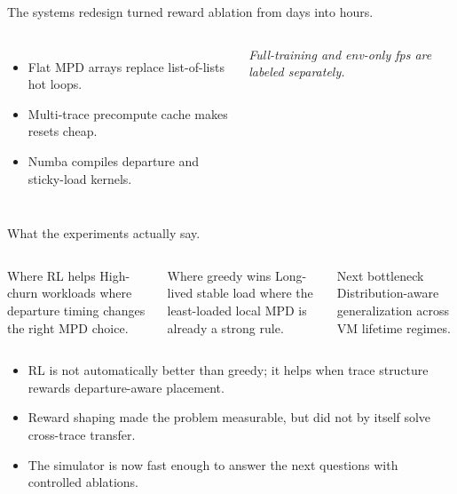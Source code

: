 \documentclass[11pt,aspectratio=43]{beamer}
\begin{document}
\begin{frame}[shrink=5]{The systems redesign turned reward ablation from days into hours.}
\begin{columns}[T,onlytextwidth]
      \vspace{0.6em}
      \begin{itemize}
        \setlength{\itemsep}{0.35em}
        \item Flat MPD arrays replace list-of-lists hot loops.
        \item Multi-trace precompute cache makes resets cheap.
        \item Numba compiles departure and sticky-load kernels.
      \end{itemize}

      \vspace{0.3em}
      \small\textit{Full-training and env-only fps are labeled separately.}

  \end{columns}

\end{frame}


\begin{frame}[shrink=5]{What the experiments actually say.}

  \begin{columns}[T,onlytextwidth]

      \begin{block}{Where RL helps}
        \small
        High-churn workloads where departure timing changes the right MPD choice.
      \end{block}

      \begin{block}{Where greedy wins}
        \small
        Long-lived stable load where the least-loaded local MPD is already a
        strong rule.
      \end{block}

      \begin{block}{Next bottleneck}
        \small
        Distribution-aware generalization across VM lifetime regimes.
      \end{block}

  \end{columns}

  \vspace{1.0em}
  \begin{itemize}
    \setlength{\itemsep}{0.65em}
    \item RL is not automatically better than greedy; it helps when trace structure
          rewards departure-aware placement.
    \item Reward shaping made the problem measurable, but did not by itself solve
          cross-trace transfer.
    \item The simulator is now fast enough to answer the next questions with
          controlled ablations.
  \end{itemize}

\end{frame}
\end{document}
